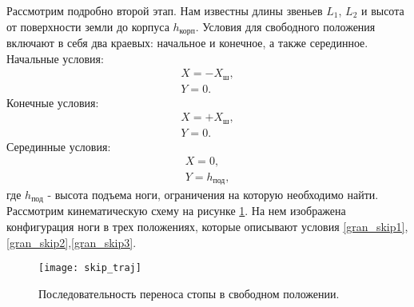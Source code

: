 Рассмотрим подробно второй этап. Нам известны длины звеньев $L_{1}$, $L_{2}$ и высота от поверхности земли до корпуса $h_{\text{корп}}$. 
Условия для свободного положения включают в себя два краевых: начальное и конечное, а также серединное.
\newline
Начальные условия:
\begin{equation}
	\begin{array}{l}
		X = -X_{\text{ш}},
		\\
		Y = 0.
	\label{gran_skip1}
	\end{array}
\end{equation}
Конечные условия:
\begin{equation}
	\begin{array}{l}
		X = +X_{\text{ш}},
		\\
		Y = 0.
	\label{gran_skip2}
	\end{array}
\end{equation}
Серединные условия:
\begin{equation}
	\begin{array}{l}
		X = 0,
		\\
		Y = h_{\text{под}},
	\end{array}
	\label{gran_skip3}
\end{equation}
где $h_{\text{под}}$ - высота подъема ноги, ограничения на которую необходимо найти.
Рассмотрим кинематическую схему на рисунке \ref{skip_traj}. На нем изображена конфигурация ноги в трех положениях, которые описывают условия \ref{gran_skip1},\ref{gran_skip2},\ref{gran_skip3}. 
\newline
\begin{figure}[h!]
	\begin{center}
		\texttt{[image: skip\_traj]}
		\caption{Последовательность переноса стопы в свободном положении.}
		\label{skip_traj}
	\end{center}
\end{figure}

